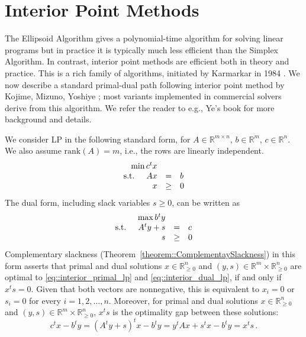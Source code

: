 \documentclass[12pt, showidx, twoside]{article}
\def\R{\mathbb{R}}
\def\Rp{\mathbb{R}_{\ge0}}
\let\oldsection\section
\def\section{\cleardoublepage\oldsection}
\begin{document}
{{{%
\section{Interior Point Methods}




The {\sc Ellipsoid Algorithm} gives a polynomial-time algorithm for solving
linear programs but in practice it is typically much less efficient than
the {\sc Simplex Algorithm}. In contrast, {\sc interior point methods} are efficient both in theory and practice. This is a rich family of algorithms, initiated by Karmarkar in 1984 \cite{Kar84}. 
We now describe a standard  primal-dual path following interior point method by Kojime, Mizuno, Yoshiye \cite{Kojima1989}; most variants implemented in commercial solvers derive from this algorithm.
We refer the reader to e.g., Ye's book \cite{Yebook} for more background and details.

We consider LP in the following standard form, for $A\in\R^{m\times n}$, $b\in\R^m$, $c\in\R^n$. We also assume $\mathrm{rank}(A)=m$, i.e., the rows are linearly independent.
\begin{equation}\label{eq::interior_primal_lp}
\begin{array}{rcl}
\min c^t x & & \\
 \mbox{s.t. \quad} Ax  & = & b\\
                        x & \geq & 0
\end{array}
\end{equation}
The dual form, including slack variables $s\ge 0$, can be written as
\begin{equation}\label{eq::interior_dual_lp}
\begin{array}{rcl}
\max b^t y & & \\
 \mbox{s.t. \quad} A^t y +s & = & c\\
                   s     & \geq & 0
\end{array}
\end{equation}
Complementary slackness (Theorem~\ref{theorem::ComplementaySlackness}) in this form asserts that primal and dual solutions $x\in\Rp^n$ and $(y,s)\in\R^m\times \Rp^n$ are optimal to \eqref{eq::interior_primal_lp} and \eqref{eq::interior_dual_lp}, if and only if $x^t s=0$. Given that both vectors are nonnegative, this is equivalent to $x_i=0$ or $s_i=0$ for every $i=1,2,\ldots,n$. Moreover, for primal and dual solutions $x\in\Rp^n$ and $(y,s)\in\R^m\times \Rp^n$,  $x^t s$ is the optimality gap between these solutions:
\begin{equation}\label{eq:opt-gap}
c^t x-b^t y =  (A^t y+s)^t x-b^t y  = y^t A x +s^t x-b^t y=x^t s\, .
\end{equation}

}}}
\end{document}

